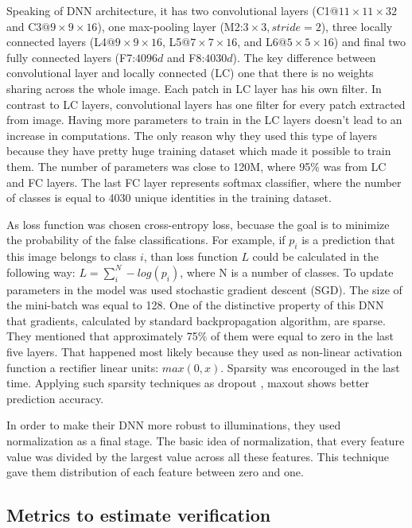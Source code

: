 \documentclass[paper=a4, fontsize=11pt]{scrartcl} %
\numberwithin{equation}{section} %
\numberwithin{figure}{section} %
\numberwithin{table}{section} %
\begin{document}
Speaking of DNN architecture, it has two convolutional layers (C1$@11\times11\times32$ and C3$@9\times9\times16$), one max-pooling layer (M2:$3\times3, stride=2$), three locally connected layers (L4$@9\times9\times16$, L5$@7\times7\times16$, and L6$@5\times5\times16$) and final two fully connected layers (F7:$4096d$ and F8:$4030d$). The key difference between convolutional layer and locally connected (LC) one that there is no weights sharing across the whole image. Each patch in LC layer has his own filter. In contrast to LC layers, convolutional layers has one filter for every patch extracted from image. Having more parameters to train in the LC layers doesn't lead to an increase in computations. The only reason why they used this type of layers because they have pretty huge training dataset which made it possible to train them. The number of parameters was close to 120M, where 95$\%$ was from LC and FC layers. The last FC layer represents softmax classifier, where the number of classes is equal to 4030 unique identities in the training dataset. \par

As loss function was chosen cross-entropy loss, becuase the goal is to minimize the probability of the false classifications. For example, if $p_i$ is a prediction that this image belongs to class $i$, than loss function $L$ could be calculated in the following way: $L = \sum_i^N-log(p_i)$, where N is a number of classes. To update parameters in the model was used stochastic gradient descent (SGD). The size of the mini-batch was equal to 128. One of the distinctive property of this DNN that gradients, calculated by standard backpropagation algorithm, are sparse. They mentioned that approximately 75$\%$ of them were equal to zero in the last five layers. That happened most likely because they used as non-linear activation function a rectifier linear units: $max(0, x)$. Sparsity was encorouged in the last time. Applying such sparsity techniques as dropout \cite{krizhevsky2012imagenet}, maxout \cite{goodfellow2013maxout} shows better prediction accuracy. \par

In order to make their DNN more robust to illuminations, they used normalization as a final stage. The basic idea of normalization, that every feature value was divided by the largest value across all these features. This technique gave them distribution of each feature between zero and one. 

\subsection{Metrics to estimate verification}
\end{document}

